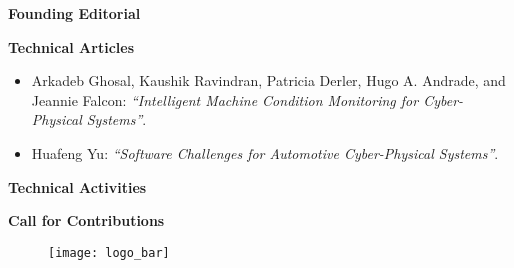 {
\setlength{\parskip}{.2in}

\textbf{Founding Editorial}

\textbf{Technical Articles}
\vspace{-.2in}
\begin{itemize}
    \item Arkadeb Ghosal, Kaushik Ravindran, Patricia Derler, Hugo A. Andrade, and Jeannie Falcon:
    \textit{``Intelligent Machine Condition Monitoring for Cyber-Physical Systems''}.
    \item Huafeng Yu:
    \textit{``Software Challenges for Automotive Cyber-Physical Systems''}.
\end{itemize}

\textbf{Technical Activities}

\textbf{Call for Contributions}

}


\begin{figure}[b!]
  \centering
  \texttt{[image: logo\_bar]}
  \caption*{}
\end{figure}


